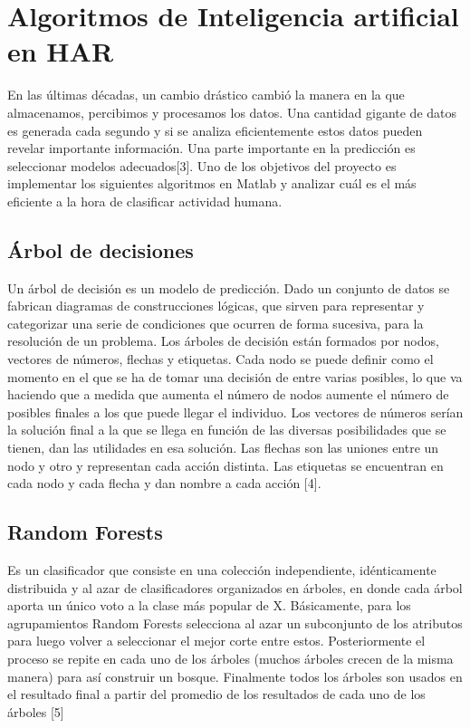 \documentclass[11pt]{report} %
\begin{document}
\section{Algoritmos de Inteligencia artificial en HAR}
En las últimas décadas, un cambio drástico cambió la manera en la que almacenamos, percibimos y procesamos los datos. Una cantidad gigante de datos es generada cada segundo y si se analiza eficientemente estos datos pueden revelar importante información. Una parte importante en la predicción es seleccionar modelos adecuados[3]. Uno de los objetivos del proyecto es implementar los siguientes algoritmos en Matlab y analizar cuál es el más eficiente a la hora de clasificar actividad humana.
\subsection {Árbol de decisiones}
 Un árbol de decisión es un modelo de predicción. Dado un conjunto de datos se fabrican diagramas de construcciones lógicas, que sirven para representar y categorizar una serie de condiciones que ocurren de forma sucesiva, para la resolución de un problema. Los árboles de decisión están formados por nodos, vectores de números, flechas y etiquetas. Cada nodo se puede definir como el momento en el que se ha de tomar una decisión de entre varias posibles, lo que va haciendo que a medida que aumenta el número de nodos aumente el número de posibles finales a los que puede llegar el individuo. Los vectores de números serían la solución final a la que se llega en función de las diversas posibilidades que se tienen, dan las utilidades en esa solución. Las flechas son las uniones entre un nodo y otro y representan cada acción distinta. Las etiquetas se encuentran en cada nodo y cada flecha y dan nombre a cada acción [4].
\subsection {Random Forests}
Es un clasificador que consiste en una colección independiente, idénticamente distribuida y al azar de clasificadores organizados en árboles, en donde cada árbol aporta un único voto a la clase más popular de X. Básicamente, para los agrupamientos Random Forests selecciona al azar un subconjunto de los atributos para luego volver a seleccionar el mejor corte entre estos. Posteriormente el proceso se repite en cada uno de los árboles (muchos árboles crecen de la misma manera) para así construir un bosque. Finalmente todos los árboles son usados en el resultado final a partir del promedio de los resultados de cada uno de los árboles [5]  
\end{document}
